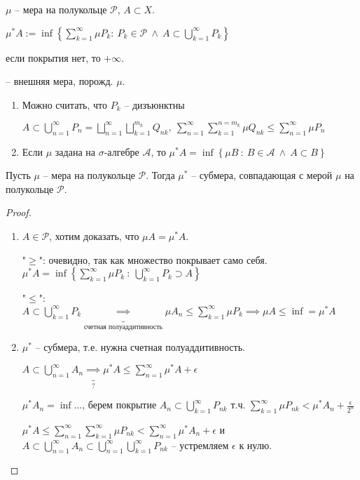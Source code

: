 \begin{definition}
    $\mu$ -- мера на полукольце $\mathcal{P}$, $A \subset X$.

    $\mu^* A := \inf{ \left\{\sum_{k=1}^{\infty} \mu P_k: \ P_k \in \mathcal{P} \ \land \ A \subset \bigcup_{k=1}^{\infty} P_k \right\}}$

    если покрытия нет, то $+\infty$.

    -- внешняя мера, порожд. $\mu$.
\end{definition}
\begin{remark}
    \begin{enumerate}
        \item {
            Можно считать, что $P_k$ -- дизъюнктны

            $A \subset \bigcup_{n=1}^{\infty} P_n = \bigsqcup_{n=1}^{\infty} \bigsqcup_{k=1}^{m_k} Q_{nk}, \ \sum_{n=1}^{\infty} \sum_{k=1}^{n=m_k} \mu Q_{nk} \leq \sum_{n=1}^{\infty} \mu P_n$
        }
        \item {
            Если $\mu$ задана на $\sigma$-алгебре $\mathcal{A}$, то $\mu^* A = \inf \left\{\mu B \ : \ B \in \mathcal{A} \ \land \ A \subset B \right\}$
        }
    \end{enumerate}
\end{remark}


\begin{theorem}
    Пусть $\mu$ -- мера на полукольце $\mathcal{P}$. Тогда $\mu^*$ -- субмера, совпадающая с мерой $\mu$ на полукольце $\mathcal{P}$.
\end{theorem}
\begin{proof}
    \begin{enumerate}
        \item {
            $A \in \mathcal{P}$, хотим доказать, что $\mu A = \mu^* A$.

            "$\geq$": очевидно, так как множество покрывает само себя. $\mu^* A = \inf\left\{ \sum_{k=1}^{\infty} \mu P_k \ : \ \bigcup_{k=1}^{\infty} P_k \supset A \right\}$

            "$\leq$": $A \subset \bigcup_{k=1}^{\infty} P_k \underbrace{\implies}_{\text{счетная полуаддитивность}} \mu A_n \leq \sum_{k=1}^{\infty} \mu P_k \implies \mu A \leq \inf = \mu^* A$
        }
        \item {
            $\mu^*$ -- субмера, т.е. нужна счетная полуаддитивность.

            $A \subset \bigcup_{n=1}^{\infty} A_n \underbrace{\implies}_{?} \mu^* A \leq \sum_{n=1}^{\infty} \mu^* A + \epsilon$

            $\mu^* A_n = \inf ... $, берем покрытие $A_n \subset \bigcup_{k=1}^{\infty} P_{nk}$ т.ч. $\sum_{k=1}^{\infty} \mu P_{nk} < \mu^* A_n + \frac{\epsilon}{2^n}$

            $\mu^* A \leq \sum_{n=1}^{\infty} \sum_{k=1}^{\infty} \mu P_{nk} < \sum_{n=1}^{\infty} \mu^* A_n + \epsilon$ и $A \subset \bigcup_{n=1}^{\infty} A_n \subset \bigcup_{n=1}^{\infty} \bigcup_{k=1}^{\infty} P_{nk}$ -- устремляем $\epsilon$ к нулю.

        }
    \end{enumerate}
\end{proof}


